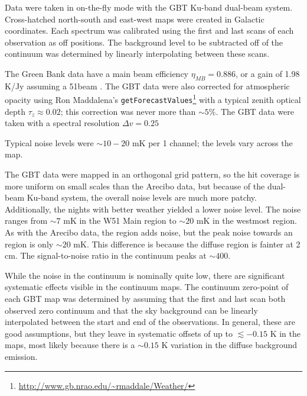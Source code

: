 Data were taken in on-the-fly mode with the GBT Ku-band dual-beam system.
Cross-hatched north-south and east-west maps were created in Galactic
coordinates. 
Each spectrum was calibrated using the first and last scans of each observation
as off positions.  The background level to be subtracted off of the
continuum was determined by linearly interpolating between these scans.


The Green Bank data have a main beam efficiency $\eta_{MB} = 0.886$, or a gain
of 1.98 K/Jy assuming a 51\arcsec beam \citep[see][for additional
discussion]{Mangum2013a}.  The GBT data were also corrected for atmospheric
opacity using Ron Maddalena's
\texttt{getForecastValues}\footnote{\url{http://www.gb.nrao.edu/~rmaddale/Weather/}}
with a typical zenith optical depth $\tau_{z}\approx0.02$; this
correction was never more than $\sim5\%$.
The GBT data were taken with a spectral resolution $\Delta v = 0.25$ \kms

Typical noise levels were $\sim10-20$ mK per 1 \kms channel; the levels vary
across the map.  

The GBT data were mapped in an orthogonal grid pattern, so the hit coverage is
more uniform on small scales than the Arecibo data, but because of the
dual-beam Ku-band system, the overall noise levels are much more patchy.
Additionally, the nights with
better weather yielded a lower noise level.  The noise ranges from $\sim7$ mK
in the W51 Main region to $\sim 20$ mK in the westmost region.  As with the
Arecibo data, the \hii region adds noise, but the peak noise towards an \hii
region is only $\sim 20$ mK.  This difference is because the diffuse \hii
region is fainter at 2 cm.  The signal-to-noise ratio in the continuum peaks at
$\sim 400$.

While the noise in the continuum is nominally quite low, there are significant
systematic effects visible in the continuum maps.  The continuum zero-point of
each GBT map was determined by assuming that the first and last scan both
observed zero continuum and that the sky background can be linearly
interpolated between the start and end of the observations.  In general, these
are good assumptions, but they leave in systematic offsets of up to
$\lesssim-0.15$ K in the maps, most likely because there is a $\sim0.15$ K
variation in the diffuse background  emission.

